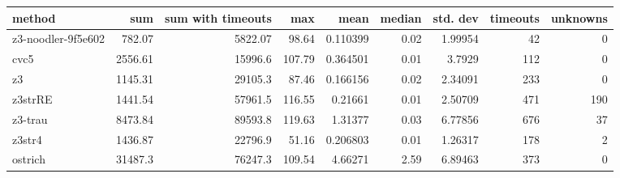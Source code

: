 \begin{tabular}{lrrrrrrrr}
\hline
 method             &      sum &   sum with timeouts &    max &     mean &   median &   std. dev &   timeouts &   unknowns \\
\hline
 z3-noodler-9f5e602 &   782.07 &             5822.07 &  98.64 & 0.110399 &     0.02 &    1.99954 &         42 &          0 \\
 cvc5               &  2556.61 &            15996.6  & 107.79 & 0.364501 &     0.01 &    3.7929  &        112 &          0 \\
 z3                 &  1145.31 &            29105.3  &  87.46 & 0.166156 &     0.02 &    2.34091 &        233 &          0 \\
 z3strRE            &  1441.54 &            57961.5  & 116.55 & 0.21661  &     0.01 &    2.50709 &        471 &        190 \\
 z3-trau            &  8473.84 &            89593.8  & 119.63 & 1.31377  &     0.03 &    6.77856 &        676 &         37 \\
 z3str4             &  1436.87 &            22796.9  &  51.16 & 0.206803 &     0.01 &    1.26317 &        178 &          2 \\
 ostrich            & 31487.3  &            76247.3  & 109.54 & 4.66271  &     2.59 &    6.89463 &        373 &          0 \\
\hline
\end{tabular}
